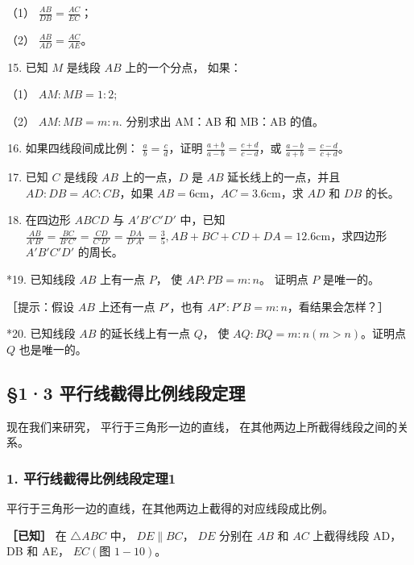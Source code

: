 （1） \(\frac{AB}{DB} = \frac{AC}{EC}\)；

（2） \(\frac{AB}{AD} = \frac{AC}{AE}\)。

\begin{enumerate}
\setcounter{enumi}{14}
\item
  已知 \(M\) 是线段 \(AB\) 上的一个分点， 如果：
\end{enumerate}

（1） \(AM:MB = 1:2;\)

（2） \(AM:MB = m:n.\) 分别求出 AM：AB 和 MB：AB 的值。

\begin{enumerate}
\setcounter{enumi}{15}
\item
  如果四线段间成比例： \(\frac{a}{b}=\frac{c}{d}\)，证明
  \(\frac{a+b}{a-b}=\frac{c+d}{c-d}\)，或
  \(\frac{a-b}{a+b}=\frac{c-d}{c+d}\)。
\item
  已知 \(C\) 是线段 \(AB\) 上的一点，\(D\) 是 \(AB\)
  延长线上的一点，并且 \(AD:DB = AC:CB\)，如果
  \(AB = 6\mathrm{cm}\)，\(AC = 3.6\mathrm{cm}\)，求 \(AD\) 和 \(DB\)
  的长。
\item
  在四边形 \(ABCD\) 与 \(A'B'C'D'\) 中，已知
  \(\frac{AB}{A'B'} = \frac{BC}{B'C'} = \frac{CD}{C'D'} = \frac{DA}{D'A'} = \frac{3}{5}, AB + BC + CD + DA = 12.6\mathrm{cm}\)，求四边形
  \(A'B'C'D'\) 的周长。
\end{enumerate}

*19. 已知线段 \(AB\) 上有一点 \(P\)， 使 \(AP:PB = m:n\)。 证明点 \(P\)
是唯一的。

［提示：假设 \(AB\) 上还有一点 \(P'\)，也有
\(AP': P'B = m:n\)，看结果会怎样？］

*20. 已知线段 \(AB\) 的延长线上有一点 \(Q\)， 使
\(AQ: BQ = m:n (m > n)\)。证明点 \(Q\) 也是唯一的。

\subsection{§1·3
平行线截得比例线段定理}

现在我们来研究， 平行于三角形一边的直线，
在其他两边上所截得线段之间的关系。

\subsubsection{1.
平行线截得比例线段定理1}

平行于三角形一边的直线，在其他两边上截得的对应线段成比例。

\textbf{［已知］} 在 \(\triangle ABC\) 中， \(DE \parallel BC\)， \(DE\)
分别在 \(AB\) 和 \(AC\) 上截得线段 AD， DB 和 AE，
\(EC(\text{图 }1-10)\)。


